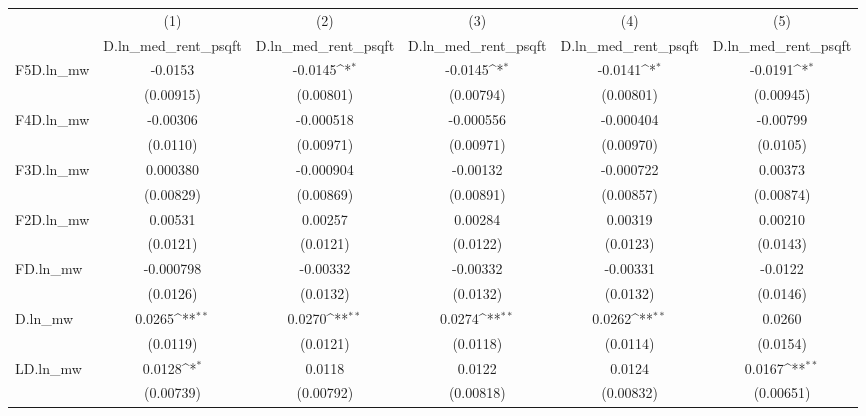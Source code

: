 {
\def\sym#1{\ifmmode^{#1}\else\(^{#1}\)\fi}
\begin{tabular}{l*{5}{c}}
\hline\hline
          &\multicolumn{1}{c}{(1)}&\multicolumn{1}{c}{(2)}&\multicolumn{1}{c}{(3)}&\multicolumn{1}{c}{(4)}&\multicolumn{1}{c}{(5)}\\
          &\multicolumn{1}{c}{D.ln\_med\_rent\_psqft}&\multicolumn{1}{c}{D.ln\_med\_rent\_psqft}&\multicolumn{1}{c}{D.ln\_med\_rent\_psqft}&\multicolumn{1}{c}{D.ln\_med\_rent\_psqft}&\multicolumn{1}{c}{D.ln\_med\_rent\_psqft}\\
\hline
F5D.ln\_mw &  -0.0153         &  -0.0145\sym{*}  &  -0.0145\sym{*}  &  -0.0141\sym{*}  &  -0.0191\sym{*}  \\
          &(0.00915)         &(0.00801)         &(0.00794)         &(0.00801)         &(0.00945)         \\
[1em]
F4D.ln\_mw & -0.00306         &-0.000518         &-0.000556         &-0.000404         & -0.00799         \\
          & (0.0110)         &(0.00971)         &(0.00971)         &(0.00970)         & (0.0105)         \\
[1em]
F3D.ln\_mw & 0.000380         &-0.000904         & -0.00132         &-0.000722         &  0.00373         \\
          &(0.00829)         &(0.00869)         &(0.00891)         &(0.00857)         &(0.00874)         \\
[1em]
F2D.ln\_mw &  0.00531         &  0.00257         &  0.00284         &  0.00319         &  0.00210         \\
          & (0.0121)         & (0.0121)         & (0.0122)         & (0.0123)         & (0.0143)         \\
[1em]
FD.ln\_mw  &-0.000798         & -0.00332         & -0.00332         & -0.00331         &  -0.0122         \\
          & (0.0126)         & (0.0132)         & (0.0132)         & (0.0132)         & (0.0146)         \\
[1em]
D.ln\_mw   &   0.0265\sym{**} &   0.0270\sym{**} &   0.0274\sym{**} &   0.0262\sym{**} &   0.0260         \\
          & (0.0119)         & (0.0121)         & (0.0118)         & (0.0114)         & (0.0154)         \\
[1em]
LD.ln\_mw  &   0.0128\sym{*}  &   0.0118         &   0.0122         &   0.0124         &   0.0167\sym{**} \\
          &(0.00739)         &(0.00792)         &(0.00818)         &(0.00832)         &(0.00651)         \\

\end{tabular}}
